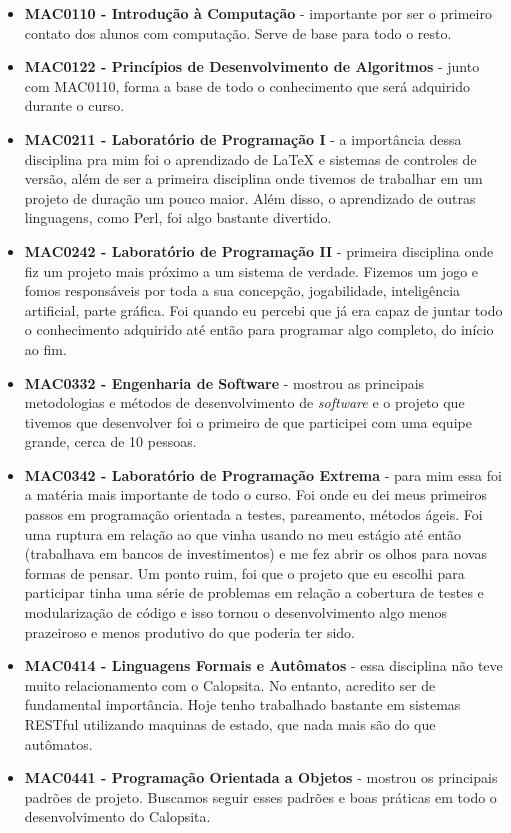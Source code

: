 \documentclass[titlepage,a4paper]{article}
\newcommand{\software}{\textit{software}}
\newcommand{\calopsita}{Calopsita}
\begin{document}
\begin{itemize}
	\item{\textbf{MAC0110 - Introdução à Computação} - importante por ser o primeiro contato dos alunos com computação. Serve de base para todo o resto.}
	\item{\textbf{MAC0122 - Princípios de Desenvolvimento de Algoritmos} - junto com MAC0110, forma a base de todo o conhecimento que será adquirido durante o curso.}
	\item{\textbf{MAC0211 - Laboratório de Programação I} - a importância dessa disciplina pra mim foi o aprendizado de LaTeX e sistemas de controles de versão, além de ser a primeira disciplina onde tivemos de trabalhar em um projeto de duração um pouco maior. Além disso, o aprendizado de outras linguagens, como Perl, foi algo bastante divertido.}
	\item{\textbf{MAC0242 - Laboratório de Programação II} - primeira disciplina onde fiz um projeto mais próximo a um sistema de verdade. Fizemos um jogo e fomos responsáveis por toda a sua concepção, jogabilidade, inteligência artificial, parte gráfica. Foi quando eu percebi que já era capaz de juntar todo o conhecimento adquirido até então para programar algo completo, do início ao fim.}
	\item{\textbf{MAC0332 - Engenharia de Software} - mostrou as principais metodologias e métodos de desenvolvimento de \software{} e o projeto que tivemos que desenvolver  foi o primeiro de que participei com uma equipe grande, cerca de 10 pessoas.}
	\item{\textbf{MAC0342 - Laboratório de Programação Extrema} - para mim essa foi a matéria mais importante de todo o curso. Foi onde eu dei meus primeiros passos em programação orientada a testes, pareamento, métodos ágeis. Foi uma ruptura em relação ao que vinha usando no meu estágio até então (trabalhava em bancos de investimentos) e me fez abrir os olhos para novas formas de pensar. Um ponto ruim, foi que o projeto que eu escolhi para participar tinha uma série de problemas em relação a cobertura de testes e modularização de código e isso tornou o desenvolvimento algo menos prazeiroso e menos produtivo do que poderia ter sido.}
	\item{\textbf{MAC0414 - Linguagens Formais e Autômatos} - essa disciplina não teve muito relacionamento com o \calopsita{}. No entanto, acredito ser de fundamental importância. Hoje tenho trabalhado bastante em sistemas RESTful utilizando maquinas de estado, que nada mais são do que autômatos.}
	\item{\textbf{MAC0441 - Programação Orientada a Objetos} - mostrou os principais padrões de projeto. Buscamos seguir esses padrões e boas práticas em todo o desenvolvimento do \calopsita{}.}
\end{itemize}
\end{document}
